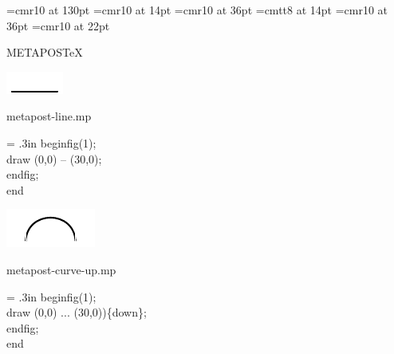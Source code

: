 \documentclass[danish,a2paper,11pt]{scrartcl}
\begin{document}
\pagecolor{Blue}


\font\romanxxl=cmr10 at 130pt
\font\romansmall=cmr10 at 14pt
\font\romanbig=cmr10 at 36pt
\font\typewritersmall=cmtt8 at 14pt
\font\metaessay=cmr10 at 36pt
\font\metatext=cmr10 at 22pt



\begin{center}
\color{White}
\normalfont\logofamily
\Huge METAPOS{\TeX}
\vspace{2cm}
\end{center}

\begin{multicols*}{3}
\addtolength{\linewidth}{1in}
\color{Black}


\vspace{4cm}

\center
\includegraphics[scale=5]{metapoints/metapoints-1.pdf}
\vspace{2cm}

\flushleft
\color{White}
\romansmall
metapost-line.mp\\
\vspace{.4cm}
\color{Black}
\typewritersmall
{\leftskip = .3in %
beginfig(1);\\
draw (0,0) -- (30,0);\\
endfig;\\
end
\par}
\vspace{2cm}

\center
\includegraphics[scale=5]{metapoints/metapoints-2.pdf}
\vspace{2cm}

\flushleft
\color{White}
\romansmall
metapost-curve-up.mp\\
\vspace{.4cm}
\color{Black}
\typewritersmall
{\leftskip = .3in
beginfig(1);\\
draw (0,0) ... (30,0))\{down\};\\
endfig;\\
end
\par}
\vspace{2cm}


\end{multicols*}
\end{document}
